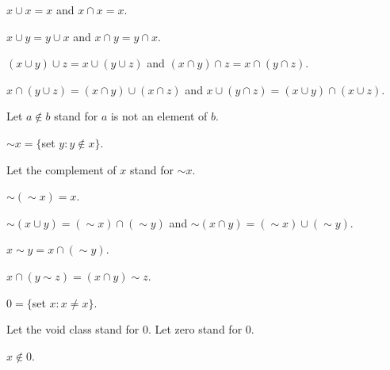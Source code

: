 \documentclass[a4paper,draft]{amsproc}
\begin{document}
\begin{forthel}
\begin{theorem}
$x \cup x = x$ and $x \cap x = x$.
\end{theorem}

\begin{theorem}
$x \cup y = y \cup x$ and $x \cap y = y \cap x$.
\end{theorem}

\begin{theorem}
$(x \cup y) \cup z = x \cup (y \cup z)$ 
and $(x \cap y) \cap z = x \cap (y \cap z)$.
\end{theorem}

\begin{theorem}
$x \cap (y \cup z) = (x \cap y) \cup (x \cap z)$
and $x \cup (y \cap z) = (x \cup y) \cap (x \cup z)$.
\end{theorem}

Let $a \notin b$ stand for $a$ is not an element of $b$.

\begin{definition} $\sim x = \{$set $y : y \notin x\}$.\end{definition}
Let the complement of $x$ stand for $\sim x$.

\begin{theorem}
$\sim (\sim x) = x$.
\end{theorem}

\begin{theorem}
$\sim (x \cup y) = (\sim x) \cap (\sim y)$ 
and $\sim (x \cap y) = (\sim x) \cup (\sim y)$.
\end{theorem}

\begin{definition} $x \sim y = x \cap (\sim y)$.\end{definition}

\begin{theorem}
$x \cap (y \sim z) = (x \cap y) \sim z$.
\end{theorem}

\begin{definition} $0 = \{$set $x : x \neq x\}$.\end{definition}
Let the void class stand for $0$.
Let zero stand for $0$.

\begin{theorem}
$x \notin 0$.
\end{theorem}


\end{forthel}
\end{document}
